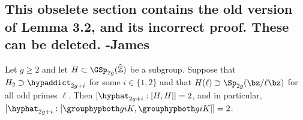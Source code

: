 \subsection*{This obselete section contains the old version of Lemma 3.2, and its incorrect proof. These can be deleted. -James}
\begin{lemma*}
Let $g \geq 2$ and let $H \subset \GSp_{2g}(\widehat{\mathbb Z})$ be a subgroup.
Suppose that $H_2 \supset \hypaddict_{2g+i}$ for some $i \in \{1,2\}$ and that
$H(\ell) \supset \Sp_{2g}(\bz/\ell \bz)$ for all odd primes $\ell$.
Then
$[\hyphat_{2g+i} : [H,H]] = 2$, and in particular, $[\hyphat_{2g+i} : [\grouphypboth g i K,\grouphypboth g i K]] = 2$. 
\end{lemma*} 
